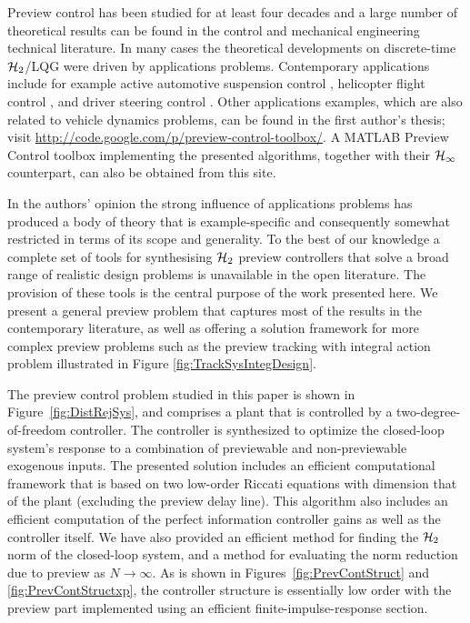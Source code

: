\label{sec:Conclusions}
Preview control has been studied for at least four decades and a large number of theoretical results can be found in the control and mechanical engineering technical literature. In many cases the theoretical developments on discrete-time $\mathcal H_2$/LQG were driven by applications problems. Contemporary applications include for example active automotive suspension control \cite{Roh_1999_Stoc_Opt_Prev,Marzbanrad_2004_SuspPrev}, helicopter flight control \cite{Paulino_2006_PreviewRotorcraftAffine}, 
and driver steering control \cite{Cole_2006_PredictiveAndPreviewSteeringControl}.
Other applications examples, which are also related to vehicle dynamics problems, can be found in the first author's thesis; visit \url{http://code.google.com/p/preview-control-toolbox/}. A MATLAB Preview Control toolbox implementing the presented algorithms, together with their $\mathcal H_\infty$ counterpart, can also be obtained from this site.

In the authors' opinion the strong influence of applications problems has produced a body of theory that is example-specific and consequently somewhat restricted in terms of its scope and generality. To the best of our knowledge a complete set of tools for synthesising $\mathcal H_2$ preview controllers that solve a broad range of realistic design problems is unavailable in the open literature. The provision of these tools is the central purpose of the work presented here. We present a general preview problem that captures most of the results in the contemporary literature, as well as offering a solution framework for more complex preview problems such as the preview tracking with integral action problem illustrated in Figure \ref{fig:TrackSysIntegDesign}.

The preview control problem studied in this paper is shown in Figure~\ref{fig:DistRejSys}, and  comprises a plant that is controlled by a two-degree-of-freedom controller. The controller is synthesized to optimize the closed-loop system's response to a combination of previewable and non-previewable exogenous inputs.  The presented solution includes an efficient computational framework that is based on two low-order Riccati equations with dimension that of the plant (excluding the preview delay line). This algorithm also includes an efficient computation of the perfect information controller gains as well as the controller itself. We have also provided an efficient method for finding the $\mathcal H_2$ norm of the closed-loop system, and a method for evaluating the norm reduction due to preview as $N \rightarrow \infty$. As is shown in Figures~\ref{fig:PrevContStruct} and \ref{fig:PrevContStructxp}, the controller structure is essentially low order with the preview part implemented using an efficient finite-impulse-response section. 

